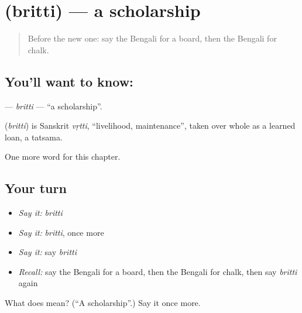 \section[\texorpdfstring{\bn{বৃত্তি} (britti)}{বৃত্তি (britti)}]{ (britti) — a scholarship}

\label{lesson:BN-C172-britti}



\begin{quote}
Before the new one: say the Bengali for a board, then the Bengali for chalk.
\end{quote}

\subsection*{You'll want to know: }
\textbf{} — \emph{britti} — \textquotedblleft{}a scholarship\textquotedblright{}.

\begin{cousinweb}
\textbf{} (\emph{britti}) is Sanskrit \emph{vṛtti}, \textquotedblleft{}livelihood, maintenance\textquotedblright{}, taken over whole as a learned loan, a tatsama.
\end{cousinweb}

\begin{grammarlens}[title={What you've built}]
One more word for this chapter.
\end{grammarlens}

\subsection*{Your turn}
\begin{itemize}
\raggedright
  \item \emph{Say it:} \emph{britti}
  \item \emph{Say it:} \emph{britti}, once more
  \item \emph{Say it:} say \emph{britti}
  \item \emph{Recall:} say the Bengali for a board, then the Bengali for chalk, then say \emph{britti} again
\end{itemize}

\begin{tcolorbox}[breakable,colback=teal!4,colframe=teal!35!black,title={Before you move on}]
What does  mean? (\textquotedblleft{}A scholarship\textquotedblright{}.) Say it once more.
\end{tcolorbox}
